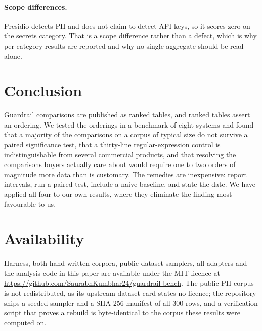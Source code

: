 \documentclass[11pt]{article}
\begin{document}
\paragraph{Scope differences.} Presidio detects PII and does not claim to detect
API keys, so it scores zero on the secrets category. That is a scope difference
rather than a defect, which is why per-category results are reported and why no
single aggregate should be read alone.

\section{Conclusion}

Guardrail comparisons are published as ranked tables, and ranked tables assert an
ordering. We tested the orderings in a benchmark of eight systems and found that
a majority of the comparisons on a corpus of typical size do not survive a paired
significance test, that a thirty-line regular-expression control is
indistinguishable from several commercial products, and that resolving the
comparisons buyers actually care about would require one to two orders of
magnitude more data than is customary. The remedies are inexpensive: report
intervals, run a paired test, include a naive baseline, and state the date. We
have applied all four to our own results, where they eliminate the finding most
favourable to us.

\section*{Availability}

Harness, both hand-written corpora, public-dataset samplers, all adapters and the
analysis code in this paper are available under the MIT licence at
\url{https://github.com/SaurabhKumbhar24/guardrail-bench}. The public PII corpus
is not redistributed, as its upstream dataset card states no licence; the
repository ships a seeded sampler and a SHA-256 manifest of all 300 rows, and a
verification script that proves a rebuild is byte-identical to the corpus these
results were computed on.
\end{document}
